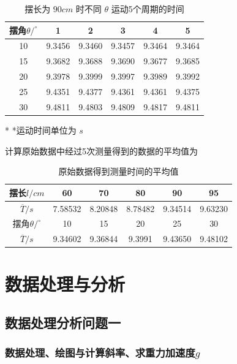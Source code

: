 \documentclass[UTF8]{ctexart}
\begin{document}
\begin{table}[H]

\centering
\caption{摆长为 $90cm$ 时不同 $\theta$ 运动5个周期的时间}
\begin{tabular}{|c|c|c|c|c|c|}
\toprule[1pt]
\midrule
摆角$\theta /^{\circ}$ & 1 & 2 & 3 & 4 & 5 \\
\midrule
10 & 9.3456 & 9.3460 & 9.3457 & 9.3464 & 9.3464 \\
\midrule
15 & 9.3682 & 9.3688 & 9.3690 & 9.3677 & 9.3685 \\
\midrule
20 & 9.3978 & 9.3999 & 9.3997 & 9.3989 & 9.3992 \\
\midrule
25 & 9.4351 & 9.4377 & 9.4361 & 9.4361 & 9.4375 \\
\midrule
30 & 9.4811 & 9.4803 & 9.4809 & 9.4817 & 9.4811 \\
\midrule
\bottomrule[1pt]
\end{tabular}
\begin{tablenotes}
\centering
    \footnotesize
    \item[*] *运动时间单位为 $s$
\end{tablenotes}

\end{table}

计算原始数据中经过5次测量得到的数据的平均值为
\begin{table}[H]
\centering
\caption{原始数据得到测量时间的平均值}
\begin{tabular}{|c|c|c|c|c|c|}
\toprule[1pt]
\midrule
摆长$l/cm$ & 60 & 70 & 80 & 90 & 95 \\
\midrule
$\overline{T} /s$ & 7.58532& 8.20848& 8.78482 & 9.34514& 9.63230 \\
\midrule
 摆角$\theta /^{\circ}$ & 10 & 15 & 20 & 25 & 30 \\
\midrule
$\overline{T} /s$ & 9.34602& 9.36844 & 9.3991 & 9.43650 & 9.48102 \\
 \midrule
\bottomrule[1pt]
\end{tabular}
\end{table}




\section{数据处理与分析}
\subsection{数据处理分析问题一}
\subsubsection{数据处理、绘图与计算斜率、求重力加速度$g$}
\end{document}
